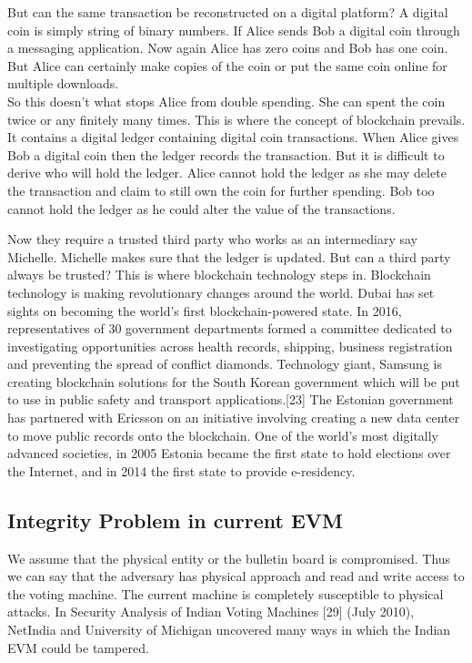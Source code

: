 \documentclass{article}
\begin{document}
But can the same transaction be reconstructed on a digital platform?  A digital coin is simply string of binary numbers. If Alice sends Bob a digital coin through a messaging application. Now again Alice has zero coins and Bob has one coin. But Alice can certainly make copies of the coin or put the same coin online for multiple downloads. \\
So this doesn't what stops Alice from double spending. She can spent the coin twice or any finitely many times.
This is where the concept of blockchain prevails. It contains a digital ledger containing digital coin transactions. When Alice gives Bob a digital coin then the ledger records the transaction. 
But it is difficult to derive who will hold the ledger. Alice cannot hold the ledger as she may delete the transaction and claim to still own the coin for further spending. Bob too cannot hold the ledger as he could alter the value of the transactions.

Now they require a trusted third party who works as an intermediary say Michelle. Michelle makes sure that the ledger is updated. But can a third party always be trusted?
This is where blockchain technology steps in.
Blockchain technology is making revolutionary changes around the world. Dubai has set sights on becoming the world's first blockchain-powered state. In 2016, representatives of 30 government departments formed a committee dedicated to investigating opportunities across health records, shipping, business registration and preventing the spread of conflict diamonds. Technology giant, Samsung is creating blockchain solutions for the South Korean government which will be put to use in public safety and transport applications.[23]  The Estonian government has partnered with Ericsson on an initiative involving creating a new data center to move public records onto the blockchain. One of the world's most digitally advanced societies, in 2005 Estonia became the first state to hold elections over the Internet, and in 2014 the first state to provide e-residency.
\subsection{Integrity Problem in current EVM}
We assume that the physical entity or the bulletin board is compromised. Thus we can say that the adversary has physical approach and read and write access to the voting machine. The current machine is completely susceptible to physical attacks. In Security Analysis of Indian Voting Machines [29] (July 2010), NetIndia and University of Michigan uncovered many ways in which the Indian EVM could be tampered.\\
\end{document}
